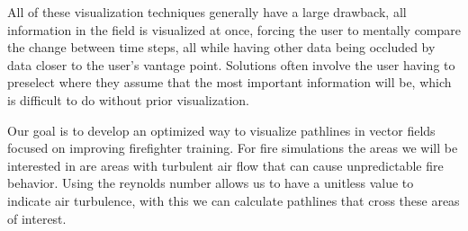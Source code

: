 All of these visualization techniques generally have a large drawback, all information in the field is visualized at once, forcing the user to mentally compare the change between time steps, all while having other data being occluded by data closer to the user’s vantage point. Solutions often involve the user having to  preselect where they assume that the most important information will be, which is difficult to do without prior visualization. 

Our goal is to develop an optimized way to visualize pathlines in vector fields focused on improving firefighter training. For fire simulations the areas we will be interested in are areas with turbulent air flow that can cause unpredictable fire behavior.  Using the reynolds number allows us to have a unitless value to indicate air turbulence, with this we can calculate pathlines that cross these areas of interest.










